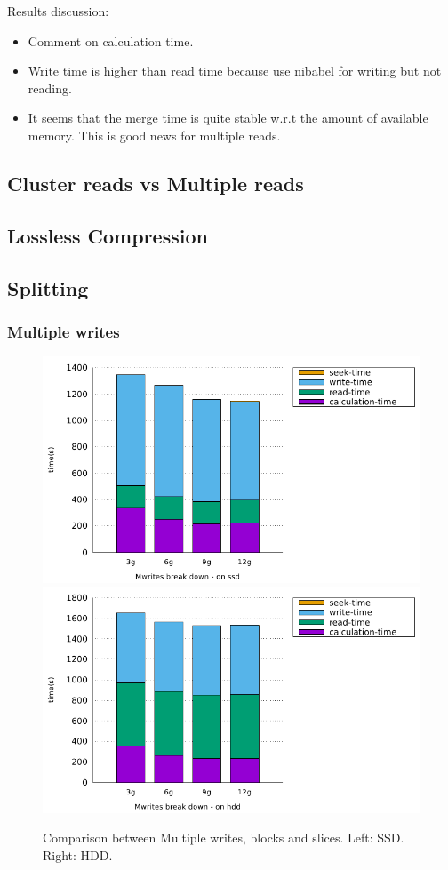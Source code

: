 \documentclass[10pt, conference, compsocconf]{IEEEtran}
\begin{document}
Results discussion:
\begin{itemize}
\item Comment on calculation time.
\item Write time is higher than read time because use nibabel for writing but not reading.
\item It seems that the merge time is quite stable w.r.t the amount of available memory. This is good news for multiple reads. 
\end{itemize}

\subsection{Cluster reads vs Multiple reads}

\subsection{Lossless Compression}

\subsection{Splitting}

\subsubsection{Multiple writes}
\begin{figure}[h]
  \centering
  \includegraphics[width=0.45\columnwidth]{figures/benchmark-mwrites/mwrites-breakdown-ssd.pdf}
  \hfill
    \includegraphics[width=0.45\columnwidth]{figures/benchmark-mwrites/mwrites-breakdown-hdd.pdf}
  \caption{Comparison between Multiple writes, blocks and slices. Left: SSD. Right: HDD.}
\label{fig:multiple-writes}
\end{figure}
\end{document}
